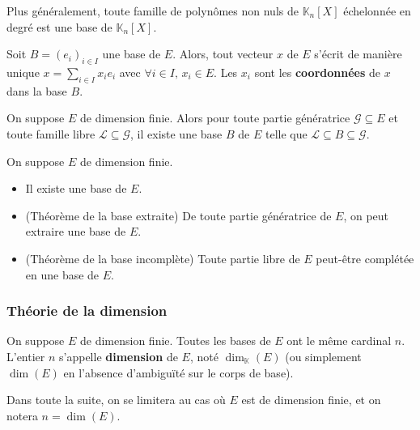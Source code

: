 
  \begin{proposition}
    Plus généralement, toute famille de polynômes non nuls de $\mathbb{K}_n[X]$ échelonnée en degré est une base de $\mathbb{K}_n[X]$.
  \end{proposition}


  \begin{proposition}
    Soit $B = (e_i)_{i \in I}$ une base de $E$. Alors, tout vecteur $x$ de $E$ s'écrit de manière unique $x = \sum_{i \in I} x_i e_i$ avec $\forall i \in I, \, x_i \in E$. Les $x_i$ sont les \textbf{coordonnées} de $x$ dans la base $B$.
  \end{proposition}

  \begin{theorem}
    On suppose $E$ de dimension finie. Alors pour toute partie génératrice $\mathcal{G} \subseteq E$ et toute famille libre $\mathcal{L} \subseteq \mathcal{G}$, il existe une base $B$ de $E$ telle que $\mathcal{L} \subseteq B \subseteq \mathcal{G}$.
  \end{theorem}

  \begin{corollary}
    On suppose $E$ de dimension finie.
    \begin{itemize}
      \item Il existe une base de $E$.
      \item (Théorème de la base extraite) De toute partie génératrice de $E$, on peut extraire une base de $E$.
      \item (Théorème de la base incomplète) Toute partie libre de $E$ peut-être complétée en une base de $E$.
    \end{itemize}
  \end{corollary}

  \subsubsection{Théorie de la dimension}

  \begin{theorem}
    On suppose $E$ de dimension finie. Toutes les bases de $E$ ont le même cardinal $n$. L'entier $n$ s'appelle \textbf{dimension} de $E$, noté $\dim_{\mathbb{K}}(E)$ (ou simplement $\dim(E)$ en l'absence d'ambiguïté sur le corps de base).
  \end{theorem}

  Dans toute la suite, on se limitera au cas où $E$ est de dimension finie, et on notera $n = \dim(E)$.

